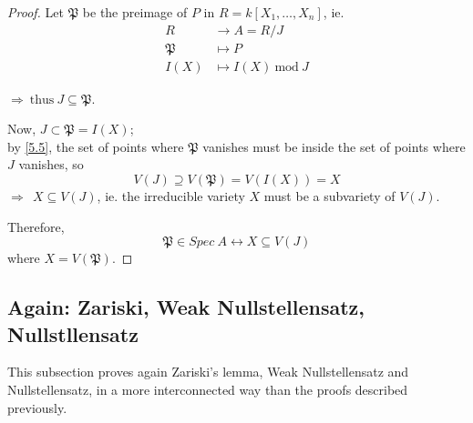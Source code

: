 \documentclass{article}
\theoremstyle{definition}
\begin{document}
\begin{proof}
  Let $\mathfrak{P}$ be the preimage of $P$ in $R=k[X_1, \ldots, X_n]$, ie.
  \begin{align*}
    R &\longrightarrow A=R/J\\
    \mathfrak{P} &\longmapsto P\\
    I(X) &\longmapsto I(X) ~\text{mod}~J
  \end{align*}

  $\Longrightarrow~ \text{thus}~ J \subseteq \mathfrak{P}$.


  Now, $J \subset \mathfrak{P} = I(X)$;\\
  by \ref{5.5}, the set of points where $\mathfrak{P}$ vanishes must be inside the set of points where $J$ vanishes, so
  $$V(J) \supseteq V(\mathfrak{P}) = V(I(X)) = X$$
  $\Longrightarrow~~ X \subseteq V(J)$, ie. the irreducible variety $X$ must be a subvariety of $V(J)$.

  Therefore,
  $$\mathfrak{P} \in Spec~ A \longleftrightarrow X \subseteq V(J)$$
  where $X = V(\mathfrak{P})$.
\end{proof}

\subsection{Again: Zariski, Weak Nullstellensatz, Nullstllensatz}
This subsection proves again Zariski's lemma, Weak Nullstellensatz and Nullstellensatz, in a more interconnected way than the proofs described previously.
\end{document}
